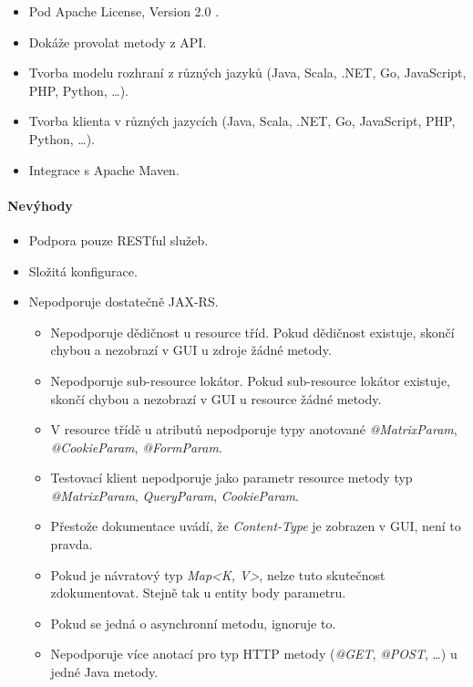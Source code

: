 \documentclass[11pt,twoside,a4paper]{book}
\begin{document}
\begin{itemize}
  \item Pod Apache License, Version 2.0 \cite{ApacheLic04}.
  \item Dokáže provolat metody z API.
  \item Tvorba modelu rozhraní z různých jazyků (Java, Scala, .NET, Go, JavaScript, PHP,
Python, \ldots).
  \item Tvorba klienta v různých jazycích (Java, Scala, .NET, Go, JavaScript, PHP, Python,
\ldots).
\item Integrace s Apache Maven.
\end{itemize}

\paragraph{Nevýhody}

\begin{itemize}
  \item Podpora pouze RESTful služeb.
  \item Složitá konfigurace.
  \item Nepodporuje dostatečně JAX-RS.
  \begin{itemize}
    \item Nepodporuje dědičnost u resource tříd. Pokud dědičnost existuje, skončí chybou a
nezobrazí v GUI u zdroje žádné metody.
    \item Nepodporuje sub-resource lokátor. Pokud sub-resource lokátor existuje,
    skončí chybou a nezobrazí v GUI u resource žádné metody.
    \item V resource třídě u atributů nepodporuje typy anotované {\em
    @MatrixParam}, {\em @CookieParam}, {\em @FormParam}.
    \item Testovací klient nepodporuje jako parametr resource metody typ
{\em @MatrixParam}, {\em QueryParam}, {\em CookieParam}.
    \item Přestože dokumentace uvádí, že {\em Content-Type} je zobrazen v GUI, není to
pravda.
    \item Pokud je návratový typ {\em Map<K, V>}, nelze tuto skutečnost
    zdokumentovat.
    Stejně tak u entity body parametru.
    \item Pokud se jedná o asynchronní metodu, ignoruje to.
    \item Nepodporuje více anotací pro typ HTTP metody ({\em @GET}, {\em @POST},
    \ldots) u jedné Java metody.
\end{itemize}
\end{itemize}
\end{document}
